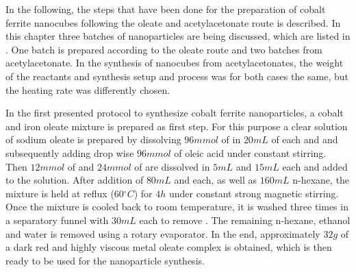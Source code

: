 \documentclass[\main/dresen_thesis.tex]{subfiles}
\begin{document}
  \label{sec:monolayers:nanoparticle:synthesisOleatesAcAc}
  In the following, the steps that have been done for the preparation of cobalt ferrite nanocubes following the oleate and acetylacetonate route is described.
  In this chapter three batches of nanoparticles are being discussed, which are listed in .
  One batch is prepared according to the oleate route and two batches from acetylacetonate.
  In the synthesis of nanocubes from acetylacetonates, the weight of the reactants and synthesis setup and process was for both cases the same, but the heating rate was differently chosen.

    In the first presented protocol to synthesize cobalt ferrite nanoparticles, a cobalt and iron oleate mixture is prepared as first step.
    For this purpose a clear solution of sodium oleate is prepared by dissolving $96 \unit{mmol}$ of  in $20 \unit{mL}$ of each  and  and subsequently adding drop wise $96 \unit{mmol}$ of oleic acid under constant stirring.
    Then $12 \unit{mmol}$ of  and $24 \unit{mmol}$ of  are dissolved in $5 \unit{mL}$  and $15 \unit{mL}$  each and added to the solution.
    After addition of $80 \unit{mL}$  and  each, as well as $160 \unit{mL}$ n-hexane, the mixture is held at reflux ($60 \unit{^\circ C}$) for $4 \unit{h}$ under constant strong magnetic stirring.
    Once the mixture is cooled back to room temperature, it is washed three times in a separatory funnel with $30 \unit{mL}$  each to remove .
    The remaining n-hexane, ethanol and water is removed using a rotary evaporator.
    In the end, approximately $32 \unit{g}$ of a dark red and highly viscous metal oleate complex is obtained, which is then ready to be used for the nanoparticle synthesis.
\end{document}
